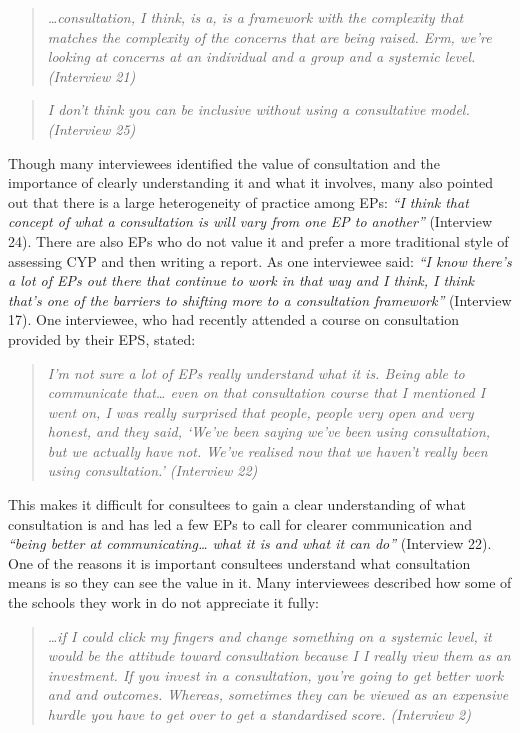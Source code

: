 \documentclass[
  english,
  man]{apa}
\begin{document}
\begin{quote}
\emph{\ldots consultation, I think, is a, is a framework with the complexity that
matches the complexity of the concerns that are being raised. Erm,
we're looking at concerns at an individual and a group and a systemic
level. (Interview 21)}
\end{quote}

\begin{quote}
\emph{I don't think you can be inclusive without using a consultative
model. (Interview 25)}
\end{quote}

Though many interviewees identified the value of consultation and the importance of clearly understanding it and what it involves, many also pointed out that there is a large heterogeneity of practice among EPs: \emph{``I think that concept of what a consultation is will vary from one EP to another''} (Interview 24). There are also EPs who do not value it and prefer a more traditional style of assessing CYP and then writing a report. As one interviewee said: \emph{``I know there's a lot of EPs out there that continue to work in that way and I think, I think that's one of the barriers to shifting more to a consultation framework''} (Interview 17). One interviewee, who had recently attended a course on consultation provided by their EPS, stated:

\begin{quote}
\emph{I'm not sure a lot of EPs really understand what it is. Being able to
communicate that\ldots{} even on that consultation course that I mentioned
I went on, I was really surprised that people, people very open and
very honest, and they said, `We've been saying we've been using
consultation, but we actually have not. We've realised now that we
haven't really been using consultation.' (Interview 22)}
\end{quote}

This makes it difficult for consultees to gain a clear understanding of what consultation is and has led a few EPs to call for clearer communication and \emph{``being better at communicating\ldots{} what it is and what it can do''} (Interview 22). One of the reasons it is important consultees understand what consultation means is so they can see the value in it. Many interviewees described how some of the schools they work in do not appreciate it fully:

\begin{quote}
\emph{\ldots if I could click my fingers and change something on a systemic level,
it would be the attitude toward consultation because I I really view
them as an investment. If you invest in a consultation, you're going
to get better work and and outcomes. Whereas, sometimes they can be
viewed as an expensive hurdle you have to get over to get a
standardised score. (Interview 2)}
\end{quote}
\end{document}
